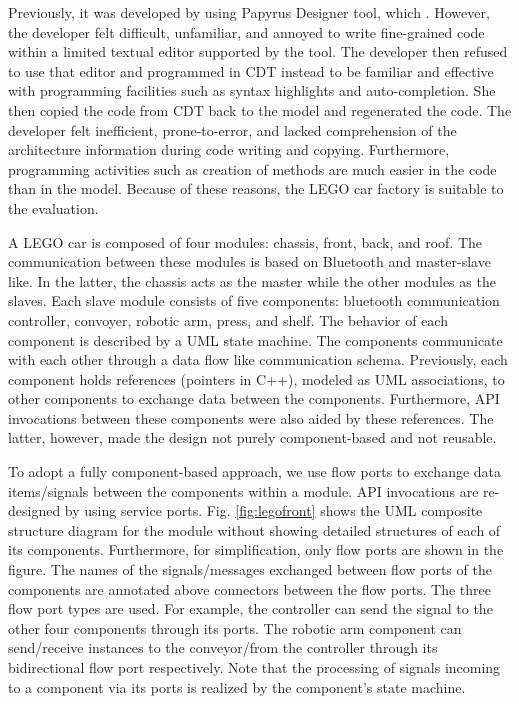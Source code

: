Previously, it was developed by using Papyrus Designer tool, which .   
However, the developer felt difficult, unfamiliar, and annoyed to write fine-grained code within a limited textual editor supported by the tool.
The developer then refused to use that editor and programmed in CDT instead to be familiar and effective with programming facilities such as syntax highlights and auto-completion.
She then copied the code from CDT back to the model and regenerated the code.
The developer felt inefficient, prone-to-error, and lacked comprehension of the architecture information during code writing and copying. 
Furthermore, programming activities such as creation of methods are much easier in the code than in the model.
Because of these reasons, the LEGO car factory is suitable to the evaluation. 

A LEGO car is composed of four modules: chassis, front, back, and roof.%
The communication between these modules is based on Bluetooth and master-slave like.
In the latter, the chassis acts as the master while the other modules as the slaves.
Each slave module consists of five components: bluetooth communication controller, convoyer, robotic arm, press, and shelf.	
The behavior of each component is described by a UML state machine.
The components communicate with each other through a data flow like communication schema.
Previously, each component holds references (pointers in C++), modeled as UML associations, to other components to exchange data between the components.
Furthermore, API invocations between these components were also aided by these references.
The latter, however, made the design not purely component-based and not reusable.

To adopt a fully component-based approach, we use flow ports to exchange data items/signals between the components within a module.
API invocations are re-designed by using service ports.   
Fig. \ref{fig:legofront} shows the UML composite structure diagram for the  module without showing detailed structures of each of its components.
Furthermore, for simplification, only flow ports are shown in the figure.
The names of the signals/messages exchanged between flow ports of the components are annotated above connectors between the flow ports.
The three flow port types are used.
For example, the controller can send the  signal to the other four components through its ports.
The robotic arm component can send/receive  instances to the conveyor/from the controller through its bidirectional flow port respectively.  
Note that the processing of signals incoming to a component via its ports is realized by the component's state machine.

